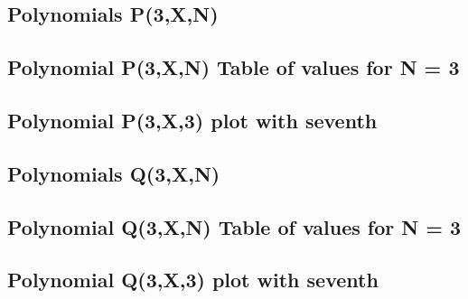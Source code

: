 \documentclass[12pt,letterpaper,oneside,reqno]{amsart}
\begin{document}

    \subsection{Polynomials P(3,X,N)}
    

    \subsection{Polynomial P(3,X,N) Table of values for N = 3}
    

    \subsection{Polynomial P(3,X,3) plot with seventh}
    


    \subsection{Polynomials Q(3,X,N)}
    

    \subsection{Polynomial Q(3,X,N) Table of values for N = 3}
    

    \subsection{Polynomial Q(3,X,3) plot with seventh}
    
\end{document}
